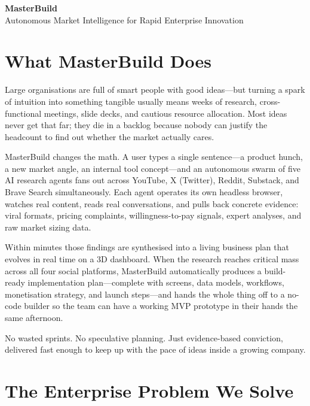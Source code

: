 \documentclass[11pt, letterpaper]{article}
\begin{document}
\begin{center}
  {\LARGE\bfseries MasterBuild}\\[6pt]
  {\color{muted}\large Autonomous Market Intelligence for Rapid Enterprise Innovation}
\end{center}

\vspace{0.6em}

\section{What MasterBuild Does}

Large organisations are full of smart people with good ideas---but turning a spark of
intuition into something tangible usually means weeks of research, cross-functional
meetings, slide decks, and cautious resource allocation. Most ideas never get that
far; they die in a backlog because nobody can justify the headcount to find out
whether the market actually cares.

MasterBuild changes the math. A user types a single sentence---a product hunch, a
new market angle, an internal tool concept---and an autonomous swarm of five AI
research agents fans out across YouTube, X (Twitter), Reddit, Substack, and Brave
Search simultaneously. Each agent operates its own headless browser, watches real
content, reads real conversations, and pulls back concrete evidence: viral formats,
pricing complaints, willingness-to-pay signals, expert analyses, and raw market
sizing data.

Within minutes those findings are synthesised into a living business plan that
evolves in real time on a 3D dashboard. When the research reaches critical mass
across all four social platforms, MasterBuild automatically produces a
build-ready implementation plan---complete with screens, data models, workflows,
monetisation strategy, and launch steps---and hands the whole thing off to a
no-code builder so the team can have a working MVP prototype in their hands the
same afternoon.

No wasted sprints. No speculative planning. Just evidence-based conviction,
delivered fast enough to keep up with the pace of ideas inside a growing company.

\section{The Enterprise Problem We Solve}
\end{document}
